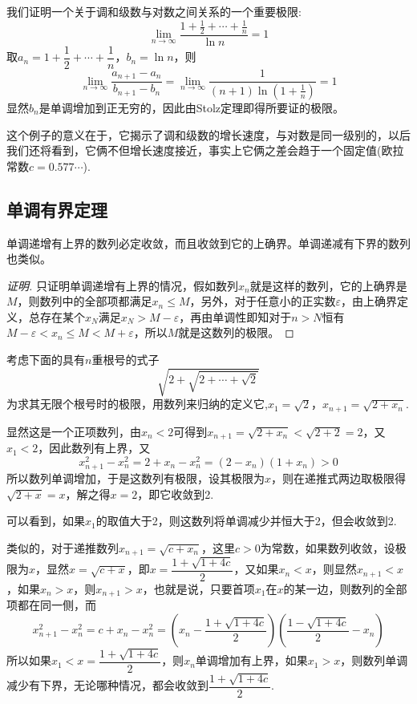 \begin{example}
  我们证明一个关于调和级数与对数之间关系的一个重要极限:
  \[ \lim_{n \to \infty} \frac{1+\frac{1}{2}+\cdots+\frac{1}{n}}{\ln{n}} = 1 \]
  取$a_n=1+\dfrac{1}{2}+\cdots+\dfrac{1}{n}$，$b_n=\ln{n}$，则
  \[ \lim_{n \to \infty} \frac{a_{n+1}-a_n}{b_{n+1}-b_n} = \lim_{n \to \infty} \frac{1}{(n+1)\ln{\left( 1+ \frac{1}{n} \right)}} = 1 \]
  显然$b_n$是单调增加到正无穷的，因此由Stolz定理即得所要证的极限。

  这个例子的意义在于，它揭示了调和级数的增长速度，与对数是同一级别的，以后我们还将看到，它俩不但增长速度接近，事实上它俩之差会趋于一个固定值(欧拉常数$c=0.577\cdots$).
\end{example}


\subsection{单调有界定理}
\label{sec:theorem-of-monotone-bounded}

\begin{theorem}
  单调递增有上界的数列必定收敛，而且收敛到它的上确界。单调递减有下界的数列也类似。
\end{theorem}

\begin{proof}[证明]
  只证明单调递增有上界的情况，假如数列$x_n$就是这样的数列，它的上确界是$M$，则数列中的全部项都满足$x_n \leqslant M$，另外，对于任意小的正实数$\varepsilon$，由上确界定义，总存在某个$x_N$满足$x_N>M-\varepsilon$，再由单调性即知对于$n>N$恒有$M-\varepsilon < x_n \leqslant M < M+\varepsilon$，所以$M$就是这数列的极限。
\end{proof}

\begin{example}
  考虑下面的具有$n$重根号的式子
  \[ \sqrt{2+\sqrt{2+\cdots+\sqrt{2}}} \]
  为求其无限个根号时的极限，用数列来归纳的定义它,$x_1=\sqrt{2}$，$x_{n+1}=\sqrt{2+x_n}$.

  显然这是一个正项数列，由$x_n<2$可得到$x_{n+1}=\sqrt{2+x_n}<\sqrt{2+2}=2$，又$x_1<2$，因此数列有上界，又
  \[ x_{n+1}^2-x_n^2=2+x_n-x_n^2=(2-x_n)(1+x_n)>0 \]
  所以数列单调增加，于是这数列有极限，设其极限为$x$，则在递推式两边取极限得$\sqrt{2+x}=x$，解之得$x=2$，即它收敛到2.

  可以看到，如果$x_1$的取值大于2，则这数列将单调减少并恒大于2，但会收敛到2.

  类似的，对于递推数列$x_{n+1}=\sqrt{c+x_n}$，这里$c>0$为常数，如果数列收敛，设极限为$x$，显然$x=\sqrt{c+x}$，即$x=\dfrac{1+\sqrt{1+4c}}{2}$，又如果$x_n<x$，则显然$x_{n+1}<x$，如果$x_n>x$，则$x_{n+1}>x$，也就是说，只要首项$x_1$在$x$的某一边，则数列的全部项都在同一侧，而
  \[ x_{n+1}^2-x_n^2=c+x_n-x_n^2=\left( x_n - \frac{1+\sqrt{1+4c}}{2} \right)\left( \frac{1-\sqrt{1+4c}}{2}-x_n \right) \]
  所以如果$x_1<x=\dfrac{1+\sqrt{1+4c}}{2}$，则$x_n$单调增加有上界，如果$x_1>x$，则数列单调减少有下界，无论哪种情况，都会收敛到$\dfrac{1+\sqrt{1+4c}}{2}$.
\end{example}

